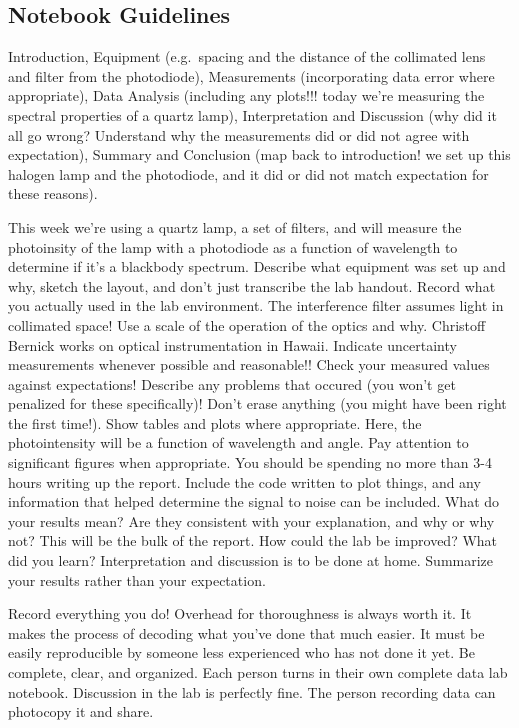 \documentclass[11pt]{article}
\begin{document}
\subsection{Notebook Guidelines}

Introduction, Equipment (e.g.~spacing and the distance of the collimated
lens and filter from the photodiode), Measurements (incorporating data
error where appropriate), Data Analysis (including any plots!!! today
we're measuring the spectral properties of a quartz lamp),
Interpretation and Discussion (why did it all go wrong? Understand why
the measurements did or did not agree with expectation), Summary and
Conclusion (map back to introduction! we set up this halogen lamp and
the photodiode, and it did or did not match expectation for these
reasons).

This week we're using a quartz lamp, a set of filters, and will measure
the photoinsity of the lamp with a photodiode as a function of
wavelength to determine if it's a blackbody spectrum. Describe what
equipment was set up and why, sketch the layout, and don't just
transcribe the lab handout. Record what you actually used in the lab
environment. The interference filter assumes light in collimated space!
Use a scale of the operation of the optics and why. Christoff Bernick
works on optical instrumentation in Hawaii. Indicate uncertainty
measurements whenever possible and reasonable!! Check your measured
values against expectations! Describe any problems that occured (you
won't get penalized for these specifically)! Don't erase anything (you
might have been right the first time!). Show tables and plots where
appropriate. Here, the photointensity will be a function of wavelength
and angle. Pay attention to significant figures when appropriate. You
should be spending no more than 3-4 hours writing up the report. Include
the code written to plot things, and any information that helped
determine the signal to noise can be included. What do your results
mean? Are they consistent with your explanation, and why or why not?
This will be the bulk of the report. How could the lab be improved? What
did you learn? Interpretation and discussion is to be done at home.
Summarize your results rather than your expectation.

Record everything you do! Overhead for thoroughness is always worth it.
It makes the process of decoding what you've done that much easier. It
must be easily reproducible by someone less experienced who has not done
it yet. Be complete, clear, and organized. Each person turns in their
own complete data lab notebook. Discussion in the lab is perfectly fine.
The person recording data can photocopy it and share.
\end{document}
